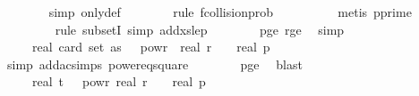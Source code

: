 \begin{isabellebody}
\ \ \ \ \ \ \isamarkupfalse%
\ {\isacharparenleft}{\kern0pt}simp\ only{\isacharcolon}{\kern0pt}{\isasymOmega}def{\isacharparenright}{\kern0pt}\isanewline
\ \ \ \ \ \ \isamarkupfalse%
\ {\isacharparenleft}{\kern0pt}rule\ f{}{\isacharunderscore}{\kern0pt}collision{\isacharunderscore}{\kern0pt}prob{\isacharparenright}{\kern0pt}\isanewline
\ \ \ \ \ \ \ \ \isamarkupfalse%
\ {\isacharparenleft}{\kern0pt}metis\ p{\isacharunderscore}{\kern0pt}prime{\isacharparenright}{\kern0pt}\isanewline
\ \ \ \ \ \ \ \isamarkupfalse%
\ {\isacharparenleft}{\kern0pt}rule\ subsetI{\isacharcomma}{\kern0pt}\ simp\ add{\isacharcolon}{\kern0pt}xs{\isacharunderscore}{\kern0pt}le{\isacharunderscore}{\kern0pt}p{\isacharparenright}{\kern0pt}\isanewline
\ \ \ \ \ \ \isamarkupfalse%
\ p{\isacharunderscore}{\kern0pt}ge{\isacharunderscore}{\kern0pt}{}\ r{\isacharunderscore}{\kern0pt}ge{\isacharunderscore}{\kern0pt}{}\ \isamarkupfalse%
\ simp{\isacharplus}{\kern0pt}\isanewline
\ \ \ \ \isamarkupfalse%
\ \isamarkupfalse%
\ {\isachardoublequoteopen}{\isachardot}{\kern0pt}{\isachardot}{\kern0pt}{\isachardot}{\kern0pt}\ {\isacharequal}{\kern0pt}\ {}\ {\isacharasterisk}{\kern0pt}\ {\isacharparenleft}{\kern0pt}real\ {\isacharparenleft}{\kern0pt}card\ {\isacharparenleft}{\kern0pt}set\ as{\isacharparenright}{\kern0pt}{\isacharparenright}{\kern0pt}{\isacharparenright}{\kern0pt}\ {\isacharasterisk}{\kern0pt}\ {}\ powr\ {\isacharparenleft}{\kern0pt}{\isacharminus}{\kern0pt}\ real\ r{\isacharparenright}{\kern0pt}\ {\isacharplus}{\kern0pt}\ {}\ {\isacharslash}{\kern0pt}\ real\ p{\isachardoublequoteclose}\isanewline
\ \ \ \ \ \ \isamarkupfalse%
\ {\isacharparenleft}{\kern0pt}simp\ add{\isacharcolon}{\kern0pt}ac{\isacharunderscore}{\kern0pt}simps\ power{}{\isacharunderscore}{\kern0pt}eq{\isacharunderscore}{\kern0pt}square{\isacharparenright}{\kern0pt}\isanewline
\ \ \ \ \ \ \isamarkupfalse%
\ p{\isacharunderscore}{\kern0pt}ge{\isacharunderscore}{\kern0pt}{}\ \isamarkupfalse%
\ blast\isanewline
\ \ \ \ \isamarkupfalse%
\ \isamarkupfalse%
\ {\isachardoublequoteopen}{\isachardot}{\kern0pt}{\isachardot}{\kern0pt}{\isachardot}{\kern0pt}\ {\isasymle}\ {}\ {\isacharasterisk}{\kern0pt}\ {\isacharparenleft}{\kern0pt}real\ t{\isacharparenright}{\kern0pt}\ {\isacharasterisk}{\kern0pt}\ {}\ powr\ {\isacharparenleft}{\kern0pt}{\isacharminus}{\kern0pt}real\ r{\isacharparenright}{\kern0pt}\ {\isacharplus}{\kern0pt}\ {}\ {\isacharslash}{\kern0pt}\ real\ p{\isachardoublequoteclose}\isanewline

\end{isabellebody}
